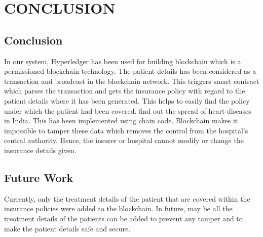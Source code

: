 \chapter{CONCLUSION} %
\section{Conclusion}
In our system, Hyperledger has been used for building blockchain which is a permissioned blockchain technology. The patient details has been considered as a transaction and broadcast in the blockchain network. This triggers smart contract which parses the transaction and gets the insurance policy with regard to the patient details where it has been generated. This helps to easily find the policy under which the patient had been covered. find out the spread of heart diseases in India. This has been implemented using chain code. Blockchain makes it impossible to tamper these data which removes the control from the hospital’s central authority. Hence, the insurer or hospital cannot modify or change the insurance details
given.
\section{Future Work}
Currently, only the treatment details of the patient that are covered within the insurance policies were added to the blockchain. In future, may be all the treatment details of the patients can be added to prevent any tamper and  to make the patient details safe and secure.




